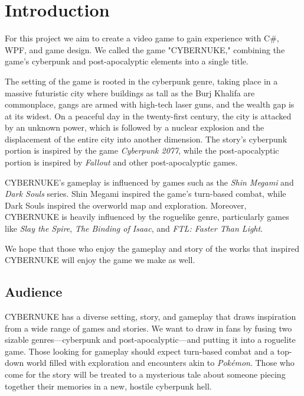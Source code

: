 \documentclass[10pt,conference,onecolumn,compsoc]{IEEEtran}
\begin{document}
\IEEEdisplaynontitleabstractindextext
\IEEEpeerreviewmaketitle



\section{Introduction}

For this project we aim to create a video game to gain experience with C\#, WPF, and game design. We called the game "CYBERNUKE," combining the game's cyberpunk and post-apocalyptic elements into a single title.

The setting of the game is rooted in the cyberpunk genre, taking place in a massive futuristic city where buildings as tall as the Burj Khalifa are commonplace, gangs are armed with high-tech laser guns, and the wealth gap is at its widest. On a peaceful day in the twenty-first century, the city is attacked by an unknown power, which is followed by a nuclear explosion and the displacement of the entire city into another dimension. The story's cyberpunk portion is inspired by the game \emph{Cyberpunk 2077}, while the post-apocalyptic portion is inspired by \emph{Fallout} and other post-apocalyptic games. 

CYBERNUKE's gameplay is influenced by games such as the \emph{Shin Megami} and \emph{Dark Souls} series. Shin Megami inspired the game's turn-based combat, while Dark Souls inspired the overworld map and exploration. Moreover, CYBERNUKE is heavily influenced by the roguelike genre, particularly games like \emph{Slay the Spire}, \emph{The Binding of Isaac}, and \emph{FTL: Faster Than Light}.

We hope that those who enjoy the gameplay and story of the works that inspired CYBERNUKE will enjoy the game we make as well.

\subsection{Audience}
CYBERNUKE has a diverse setting, story, and gameplay that draws inspiration from a wide range of games and stories. We want to draw in fans by fusing two sizable genres—cyberpunk and post-apocalyptic—and putting it into a roguelite game. Those looking for gameplay should expect turn-based combat and a top-down world filled with exploration and encounters akin to \emph{Pokémon}. Those who come for the story will be treated to a mysterious tale about someone piecing together their memories in a new, hostile cyberpunk hell. 
\end{document}
